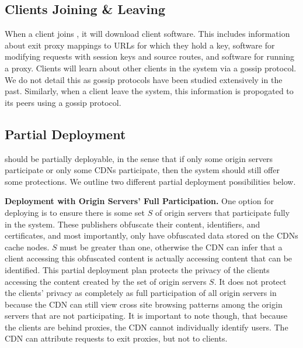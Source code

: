 \subsection{Clients Joining \& Leaving}
\label{sec:join}

When a client joins \system{}, it will download \system{} client software.  This
includes information about exit proxy mappings to URLs for which they hold a key, 
software for modifying requests with session keys and source routes, and software for running a proxy.  Clients will learn about other clients in the system via 
a gossip protocol.  We do not detail this as gossip protocols have been studied extensively in the past.  Similarly, when a client leave the system, this 
information is propogated to its peers using a gossip protocol.

\subsection{Partial Deployment}
\label{sec:partial}
\system{} should be partially deployable, in the sense that if only some origin servers participate or only some CDNs participate, then 
the system should still offer some protections.  We outline two different partial
deployment possibilities below.

\textbf{Deployment with Origin Servers' Full Participation.}
One option for deploying \system{} is to ensure there is some set $S$ of origin servers that participate fully in the 
system.  These publishers obfuscate their content, identifiers, and certificates, and most importantly, only have 
obfuscated data stored on the CDNs cache nodes.  $S$ must be greater than one, otherwise the CDN can infer 
that a client accessing this obfuscated content is actually accessing content that can be identified.  This partial deployment plan 
 protects the privacy of the clients accessing the content created by the set of origin servers $S$.  It does not 
protect the clients' privacy as completely as full participation of all origin servers in \system{} because the CDN can 
still view cross site browsing patterns among the origin servers that are not participating. It is important to note though, that 
because the clients are behind proxies, the CDN cannot individually identify users.  The CDN can attribute requests to exit proxies, but 
not to clients.  

